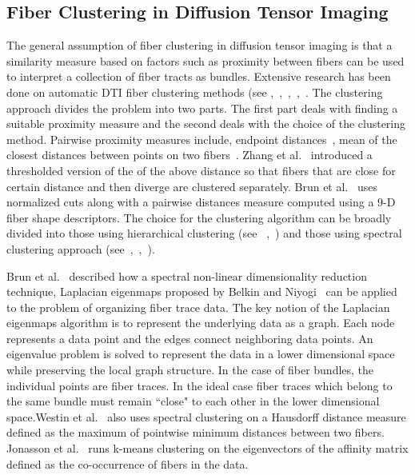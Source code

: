 \subsection {Fiber Clustering in Diffusion Tensor Imaging}
\label {subsec:fiberClus}

The general assumption of fiber clustering in diffusion tensor imaging is that a similarity measure based on factors such as proximity between fibers can be used to interpret a collection of fiber tracts as bundles.  Extensive research has been done on automatic DTI fiber clustering methods (see \cite{Corouge2004},~\cite{Brun2003},~\cite{Brun2004},~\cite{Zhang2008},~\cite{westinMEDIA02}. 
 The clustering approach divides the problem into two parts. The first part deals with finding a suitable proximity measure and the second deals with the choice of the clustering method. Pairwise proximity measures include, endpoint distances~\cite{Brun2003},  mean of the closest distances between points on two fibers~\cite{Corouge2004}. Zhang et al.~\cite{Zhang2008} introduced a thresholded version of the of the above distance so that fibers that are close for certain distance and then  diverge are clustered separately. Brun et al.~\cite{Brun2004} uses normalized cuts along with a pairwise distances  measure computed using a 9-D fiber shape descriptors. The choice for the clustering algorithm can be broadly divided into those using hierarchical clustering (see ~\cite{Moberts2005},~\cite{Zhang2008}) and those using spectral clustering approach (see~\cite{jonasson2005},~\cite{ODonnell2007},~\cite{Brun2004}).
 
Brun et al.~\cite{Brun2003} described how a spectral non-linear dimensionality reduction technique,  Laplacian eigenmaps proposed by Belkin and Niyogi~\cite{Belkin01} can be applied to the problem of organizing fiber trace data. The key notion of the Laplacian eigenmaps algorithm is to represent the underlying data as a graph. Each node represents a data point and the edges connect neighboring data points. An eigenvalue problem is solved to represent the data in a lower dimensional space while preserving the local graph structure. In the case of fiber bundles, the individual points are fiber traces. In the ideal case fiber traces which belong to the same bundle must remain ``close" to each other in the lower dimensional space.Westin et al.~\cite{westinMEDIA02} also uses spectral clustering on a Hausdorff distance measure defined as the maximum of pointwise minimum distances between two fibers. Jonasson et al.~\cite{jonasson2005} runs k-means clustering on the eigenvectors of the affinity matrix defined as the co-occurrence of fibers in the data.

